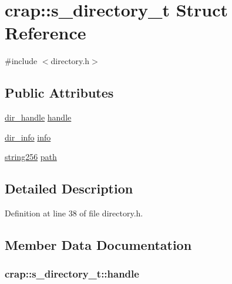 \hypertarget{structcrap_1_1s__directory__t}{}\section{crap\+:\+:s\+\_\+directory\+\_\+t Struct Reference}
\label{structcrap_1_1s__directory__t}


{\ttfamily \#include $<$directory.\+h$>$}

\subsection*{Public Attributes}
\begin{DoxyCompactItemize}
\item 
\hyperlink{directory_8h_a6903c6a823657529f2da5d6f05332329}{dir\+\_\+handle} \hyperlink{structcrap_1_1s__directory__t_acd5d86498e69e796777e52d597e92a1c}{handle}
\item 
\hyperlink{directory_8h_a807975fd00b38b5fd8ce43bad2b4825a}{dir\+\_\+info} \hyperlink{structcrap_1_1s__directory__t_a2ab0c80ea970953293688d2851c57e89}{info}
\item 
\hyperlink{namespacecrap_af674ac1cc38a09c563c68dfc3b15e554}{string256} \hyperlink{structcrap_1_1s__directory__t_a4bf89a8c3195f77152bbd81f690f9b38}{path}
\end{DoxyCompactItemize}


\subsection{Detailed Description}


Definition at line 38 of file directory.\+h.



\subsection{Member Data Documentation}
\hypertarget{structcrap_1_1s__directory__t_acd5d86498e69e796777e52d597e92a1c}{}
\subsubsection[{handle}]{ crap\+::s\+\_\+directory\+\_\+t\+::handle}\label{structcrap_1_1s__directory__t_acd5d86498e69e796777e52d597e92a1c}


